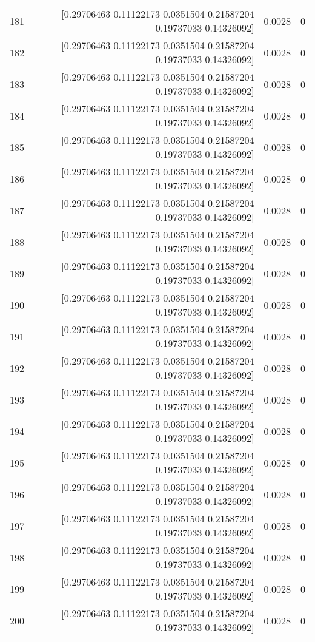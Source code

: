 \begin{longtable}{lrrr}
181 & [0.29706463 0.11122173 0.0351504  0.21587204 0.19737033 0.14326092] & 0.0028 & 0 \\
182 & [0.29706463 0.11122173 0.0351504  0.21587204 0.19737033 0.14326092] & 0.0028 & 0 \\
183 & [0.29706463 0.11122173 0.0351504  0.21587204 0.19737033 0.14326092] & 0.0028 & 0 \\
184 & [0.29706463 0.11122173 0.0351504  0.21587204 0.19737033 0.14326092] & 0.0028 & 0 \\
185 & [0.29706463 0.11122173 0.0351504  0.21587204 0.19737033 0.14326092] & 0.0028 & 0 \\
186 & [0.29706463 0.11122173 0.0351504  0.21587204 0.19737033 0.14326092] & 0.0028 & 0 \\
187 & [0.29706463 0.11122173 0.0351504  0.21587204 0.19737033 0.14326092] & 0.0028 & 0 \\
188 & [0.29706463 0.11122173 0.0351504  0.21587204 0.19737033 0.14326092] & 0.0028 & 0 \\
189 & [0.29706463 0.11122173 0.0351504  0.21587204 0.19737033 0.14326092] & 0.0028 & 0 \\
190 & [0.29706463 0.11122173 0.0351504  0.21587204 0.19737033 0.14326092] & 0.0028 & 0 \\
191 & [0.29706463 0.11122173 0.0351504  0.21587204 0.19737033 0.14326092] & 0.0028 & 0 \\
192 & [0.29706463 0.11122173 0.0351504  0.21587204 0.19737033 0.14326092] & 0.0028 & 0 \\
193 & [0.29706463 0.11122173 0.0351504  0.21587204 0.19737033 0.14326092] & 0.0028 & 0 \\
194 & [0.29706463 0.11122173 0.0351504  0.21587204 0.19737033 0.14326092] & 0.0028 & 0 \\
195 & [0.29706463 0.11122173 0.0351504  0.21587204 0.19737033 0.14326092] & 0.0028 & 0 \\
196 & [0.29706463 0.11122173 0.0351504  0.21587204 0.19737033 0.14326092] & 0.0028 & 0 \\
197 & [0.29706463 0.11122173 0.0351504  0.21587204 0.19737033 0.14326092] & 0.0028 & 0 \\
198 & [0.29706463 0.11122173 0.0351504  0.21587204 0.19737033 0.14326092] & 0.0028 & 0 \\
199 & [0.29706463 0.11122173 0.0351504  0.21587204 0.19737033 0.14326092] & 0.0028 & 0 \\
200 & [0.29706463 0.11122173 0.0351504  0.21587204 0.19737033 0.14326092] & 0.0028 & 0 \\

\end{longtable}

